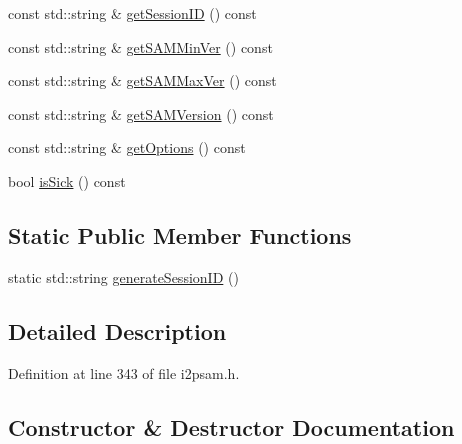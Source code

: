 \begin{DoxyCompactItemize}
\item 
const std\+::string \& \hyperlink{class_s_a_m_1_1_stream_session_aa56685f7eb722fa6263f3b846403dfd7}{get\+Session\+I\+D} () const 
\item 
const std\+::string \& \hyperlink{class_s_a_m_1_1_stream_session_a52994ee722b876372798e6c7b8e0e6fd}{get\+S\+A\+M\+Min\+Ver} () const 
\item 
const std\+::string \& \hyperlink{class_s_a_m_1_1_stream_session_ae7e0768be0d970be5f24aeea72cde44e}{get\+S\+A\+M\+Max\+Ver} () const 
\item 
const std\+::string \& \hyperlink{class_s_a_m_1_1_stream_session_aaedeb73600e08b48e1a7d13686e668e5}{get\+S\+A\+M\+Version} () const 
\item 
const std\+::string \& \hyperlink{class_s_a_m_1_1_stream_session_ac92dbb8ac26fbd0b100e79402a9f42d3}{get\+Options} () const 
\item 
bool \hyperlink{class_s_a_m_1_1_stream_session_a75d2823d28c7f31c0a19533ad4cd0abd}{is\+Sick} () const 
\end{DoxyCompactItemize}
\subsection*{Static Public Member Functions}
\begin{DoxyCompactItemize}
\item 
static std\+::string \hyperlink{class_s_a_m_1_1_stream_session_abe3c3463ae7985a8f506c091d756d6b9}{generate\+Session\+I\+D} ()
\end{DoxyCompactItemize}


\subsection{Detailed Description}


Definition at line 343 of file i2psam.\+h.



\subsection{Constructor \& Destructor Documentation}
\hypertarget{class_s_a_m_1_1_stream_session_a8c0e662f65ac3b0bf9da6dac1f051400}{}
